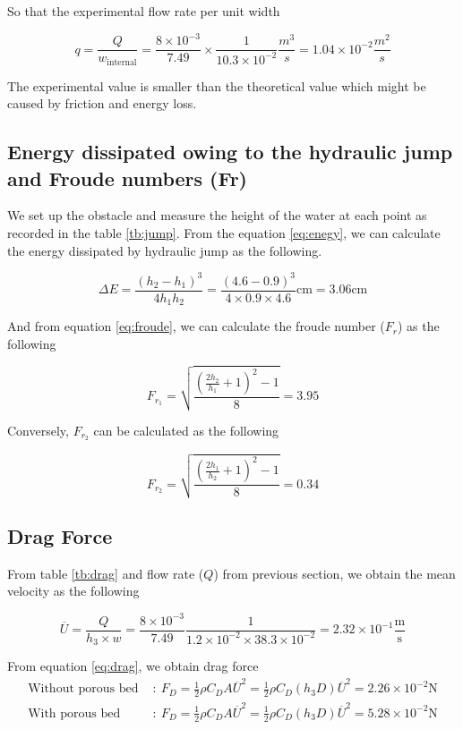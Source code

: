 \documentclass[a4paper]{report}
\begin{document}
So that the experimental flow rate per unit width

\[q=\frac{Q}{w_{\text{internal}}}=\frac{8\times10^{-3}}{7.49}\times\frac{1}{10.3\times10^{-2}}\frac{m^3}{s}=1.04\times10^{-2}\frac{m^2}{s}\]

The experimental value is smaller than the theoretical value which might be caused by friction and energy loss.

\subsection{Energy dissipated owing to the hydraulic jump and Froude numbers (Fr)}
We set up the obstacle and measure the height of the water at each point as recorded in the table \ref{tb:jump}. From the equation \ref{eq:enegy}, we can calculate the energy dissipated by hydraulic jump as the following.

\[\Delta E = \frac{\left(h_2-h_1\right)^3}{4h_1h_2}=\frac{\left(4.6-0.9\right)^3}{4\times0.9\times4.6}\text{cm}=3.06\text{cm}\]

And from equation \ref{eq:froude}, we can calculate the froude number ($F_r$) as the following

\[F_{r_1}=\sqrt{\frac{\left(\displaystyle\frac{2h_2}{h_1}+1\right)^2-1}{8}}=3.95\]

Conversely, $F_{r_2}$ can be calculated as the following

\[F_{r_2}=\sqrt{\frac{\left(\displaystyle\frac{2h_1}{h_2}+1\right)^2-1}{8}}=0.34\]

\subsection{Drag Force}
From table \ref{tb:drag} and flow rate ($Q$) from previous section, we obtain the mean velocity as the following

\[\overline{U}=\frac{Q}{h_3\times w}=\frac{8\times 10 ^ {-3}}{7.49}\frac{1}{1.2\times10^{-2}\times38.3\times10^{-2}}=2.32\times10^{-1}\frac{\text{m}}{\text{s}}\]

From equation \ref{eq:drag}, we obtain drag force
\begin{align*}
    \text{Without porous bed } &: \ F_D=\frac{1}{2}\rho C_DA\overline{U}^2= \frac{1}{2}\rho C_D(h_3D)\overline{U}^2=2.26\times10^{-2}\text{N} \\
    \text{With porous bed } &: \ F_D=\frac{1}{2}\rho C_DA\overline{U}^2= \frac{1}{2}\rho C_D(h_3D)\overline{U}^2=5.28\times10^{-2}\text{N}
\end{align*}
\end{document}
